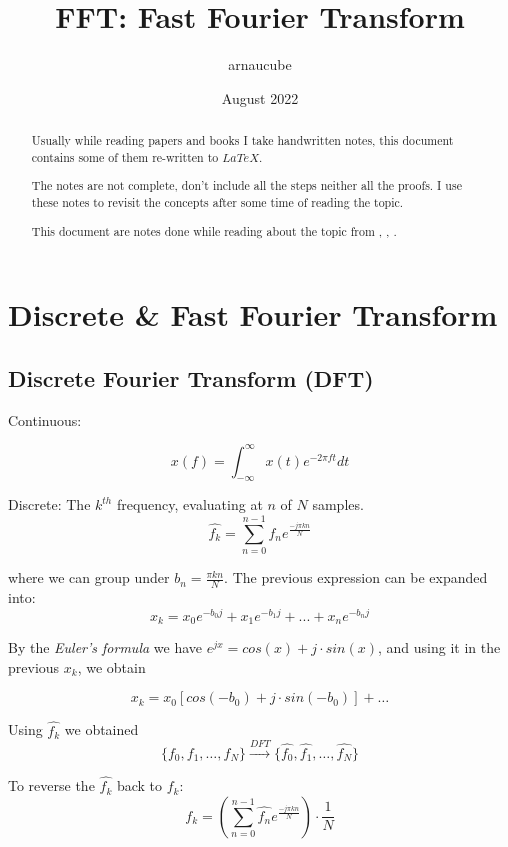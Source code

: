\documentclass{article}
\title{FFT: Fast Fourier Transform}
\author{arnaucube}
\date{August 2022}
\theoremstyle{definition}
\begin{document}
\maketitle

\begin{abstract}
  Usually while reading papers and books I take handwritten notes, this document contains some of them re-written to $LaTeX$.

  The notes are not complete, don't include all the steps neither all the proofs. I use these notes to revisit the concepts after some time of reading the topic.

  This document are notes done while reading about the topic from \cite{gstrang}, \cite{tpornin}, \cite{rfateman}.
\end{abstract}

\tableofcontents

\section{Discrete \& Fast Fourier Transform}

\subsection{Discrete Fourier Transform (DFT)}

Continuous:

$$
x(f) = \int_{-\infty}^{\infty} x(t) e^{-2 \pi f t} dt
$$

Discrete:
The $k^{th}$ frequency, evaluating at $n$ of $N$ samples.
$$
\hat{f_k} = \sum_{n=0}^{n-1} f_n e^{\frac{-j \pi kn}{N}}
$$

where we can group under $b_n = \frac{\pi kn}{N}$. The previous expression can be expanded into:
$$
x_k = x_0 e^{-b_0 j} + x_1 e^{-b_1 j} + ... + x_n e^{-b_n j}
$$

By the \emph{Euler's formula} we have $e^{jx} = cos(x) + j\cdot sin(x)$, and using it in the previous $x_k$, we obtain

$$
x_k = x_0 [cos(-b_0) + j \cdot sin(-b_0)] + \ldots
$$

Using $\hat{f_k}$ we obtained
$$
\{f_0, f_1, \ldots, f_N\} \xrightarrow{DFT} \{ \hat{f_0}, \hat{f_1}, \ldots, \hat{f_N} \}
$$

To reverse the $\hat{f_k}$ back to $f_k$:
$$
f_k = \left( \sum_{n=0}^{n-1} \hat{f_n} e^{\frac{-j \pi kn}{N}} \right) \cdot \frac{1}{N}
$$
\end{document}
